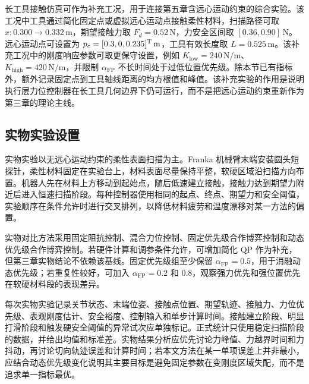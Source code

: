 长工具接触仿真可作为补充工况，用于连接第五章含远心运动约束的综合实验。该工况中工具通过简化固定点或虚拟远心运动点接触柔性材料，扫描路径可取 $x:0.300\to0.332\,\mathrm{m}$，期望接触力取 $F_d=0.52\,\mathrm{N}$，力安全区间取 $[0.36,0.90]\,\mathrm{N}$。远心运动点可设置为 $p_c=[0.3,0,0.235]^{\mathrm{T}}\,\mathrm{m}$，工具有效长度取 $L=0.525\,\mathrm{m}$。该补充工况中的刚度响应参数可取更保守设置，例如 $K_{\mathrm{low}}=240\,\mathrm{N/m}$、$K_{\mathrm{high}}=420\,\mathrm{N/m}$，并限制 $\alpha_{\mathrm{FP}}$ 不长时间处于过低位置优先级。除本节已有指标外，额外记录固定点到工具轴线距离的均方根值和峰值。该补充实验的作用是说明执行层力位控制器在长工具几何边界下仍可运行，而不是把远心运动约束重新作为第三章的理论主线。

\subsection{实物实验设置}
\label{subsec:ch3_real_setup}

实物实验以无远心运动约束的柔性表面扫描为主。Franka 机械臂末端安装圆头短探针，柔性材料固定在实验台上，材料表面尽量保持平整，软硬区域沿扫描方向布置。机器人先在材料上方移动到起始点，随后低速建立接触，接触力达到期望力附近后进入恒速扫描阶段。每种控制器使用相同的起点、终点、期望力和安全阈值，实验顺序在条件允许时进行交叉排列，以降低材料疲劳和温度漂移对某一方法的偏置。

实物对比方法采用固定阻抗控制、混合力位控制、固定优先级合作博弈控制和动态优先级合作博弈控制。若硬件计算和调参条件允许，可增加简化 QP 作为补充，但第三章实物结论不依赖该基线。固定优先级组至少保留 $\alpha_{\mathrm{FP}}=0.5$，用于消融动态优先级；若重复性较好，可加入 $\alpha_{\mathrm{FP}}=0.2$ 和 $0.8$，观察强力优先和强位置优先在软硬材料段的表现差异。

每次实物实验记录关节状态、末端位姿、接触点位置、期望轨迹、接触力、力位优先级、表观刚度估计、安全裕度、控制输入和单步计算时间。接触建立阶段、明显打滑阶段和触发硬安全阈值的异常试次应单独标记。正式统计只使用稳定扫描阶段的数据，并给出均值和标准差。实物结果分析应优先讨论力峰值、力越界时间和力抖动，再讨论切向轨迹误差和计算时间；若本文方法在某一单项误差上并非最小，应结合动态优先级变化说明其主要目标是避免固定参数在变刚度区域失配，而不是追求单一指标最优。
